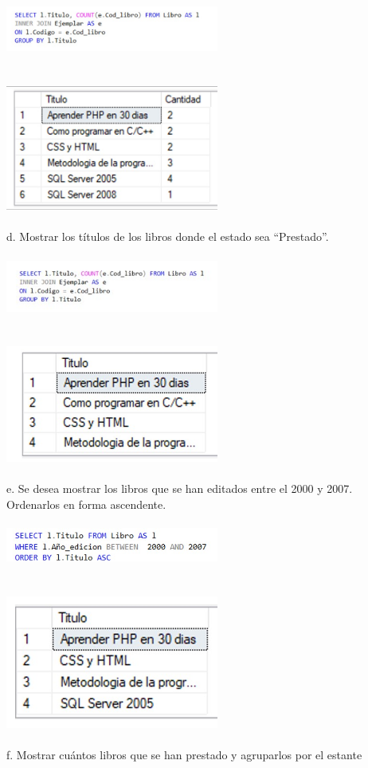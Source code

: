 \documentclass[preprint,12pt]{elsarticle}
\begin{document}
\begin{itemize}
		\\ \includegraphics[width=7cm]{./IMAGENES/2.3} \\
		\\
		\\ \includegraphics[width=7cm]{./IMAGENES/2.3.1} \\
		\\ d. Mostrar los títulos de los libros donde el estado sea “Prestado”.
		\\
		\\ \includegraphics[width=7cm]{./IMAGENES/2.4} \\
		\\
		\\ \includegraphics[width=7cm]{./IMAGENES/2.4.1} \\
		\\ e. Se desea mostrar los libros que se han editados entre el 2000 y 2007. Ordenarlos en
		forma ascendente.
		\\
		\\ \includegraphics[width=7cm]{./IMAGENES/2.5} \\
		\\
		\\ \includegraphics[width=7cm]{./IMAGENES/2.5.1} \\
		\\ f. Mostrar cuántos libros que se han prestado y agruparlos por el estante
		

\end{itemize}
\end{document}
